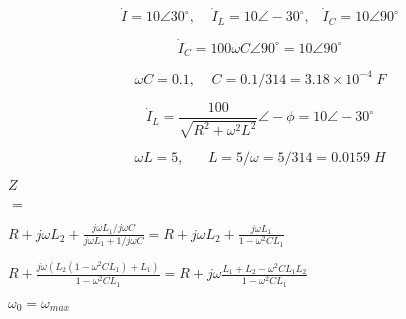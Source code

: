 {\newpage\clearpage
{}%
\begin{displaymath} \dot{I}=10\angle 30^\circ,\;\;\;\;\dot{I}_L=10\angle -30^\circ,\;\;\;\dot{I}_C=10\angle 90^\circ  \end{displaymath}%
\lthtmldisplayZ
\lthtmlcheckvsize\clearpage}

{\newpage\clearpage
{}%
\begin{displaymath} \dot{I}_C=100\omega C \angle 90^\circ=10\angle 90^\circ \end{displaymath}%
\lthtmldisplayZ
\lthtmlcheckvsize\clearpage}

{\newpage\clearpage
{}%
\begin{displaymath} \omega C=0.1,\;\;\;\;C=0.1/314=3.18\times 10^{-4} \; F\end{displaymath}%
\lthtmldisplayZ
\lthtmlcheckvsize\clearpage}

{\newpage\clearpage
{}%
\begin{displaymath} \dot{I}_L=\frac{100}{\sqrt{R^2+\omega^2 L^2}}\angle -\phi=10\angle -30^\circ \end{displaymath}%
\lthtmldisplayZ
\lthtmlcheckvsize\clearpage}

{\newpage\clearpage
{}%
\begin{displaymath} \omega L=5,\;\;\;\;\;\;L=5/\omega=5/314=0.0159\;H \end{displaymath}%
\lthtmldisplayZ
\lthtmlcheckvsize\clearpage}

{\newpage\clearpage
{}%
$\displaystyle Z$%
\lthtmlindisplaymathZ
\lthtmlcheckvsize\clearpage}

{\newpage\clearpage
{}%
$\textstyle =$%
\lthtmlindisplaymathZ
\lthtmlcheckvsize\clearpage}

{\newpage\clearpage
{}%
$\displaystyle R+j\omega L_2+\frac{j\omega L_1/j\omega C}{j\omega L_1+1/j\omega C}
=R+j\omega L_2+\frac{j\omega L_1}{1-\omega^2 CL_1}$%
\lthtmlindisplaymathZ
\lthtmlcheckvsize\clearpage}

{\newpage\clearpage
{}%
$\displaystyle R+\frac{j\omega(L_2(1-\omega^2CL_1)+L_1)}{1-\omega^2 CL_1}
=R+j\omega \frac{L_1+L_2-\omega^2CL_1L_2}{1-\omega^2CL_1}$%
\lthtmlindisplaymathZ
\lthtmlcheckvsize\clearpage}

{\newpage\clearpage
{}%
$\omega_0=\omega_{max}$%
\lthtmlinlinemathZ
\lthtmlcheckvsize\clearpage}

